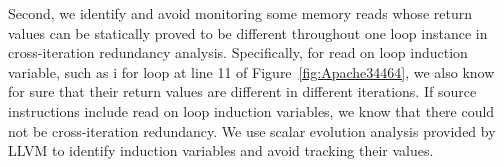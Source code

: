 Second, we identify and avoid monitoring some memory reads whose return values 
can be statically proved to be different throughout one loop instance in 
cross-iteration redundancy analysis.
Specifically, for read on loop induction variable, such as i for loop at line 11 of Figure~\ref{fig:Apache34464}, 
we also know for sure that their return
values are different in different iterations. 
If source instructions include read on loop induction variables, we know that 
there could not be cross-iteration redundancy. 
We use scalar evolution analysis
provided by LLVM to identify induction variables and avoid tracking their
values.

%


 


